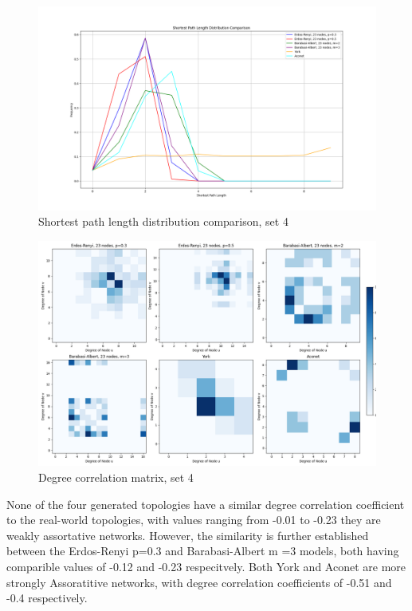 \begin{figure}
    \centering
    \includegraphics[width=0.9\linewidth]{images/FINAL-TOPO-COMP/line-23.png}
    \caption{Shortest path length distribution comparison, set 4}
    \label{fig:enter-label}
\end{figure}

\begin{figure}
    \centering
    \includegraphics[width=0.9\linewidth]{images/FINAL-TOPO-COMP/Degree-correlation-matrices/23-matrix.png}
    \caption{Degree correlation matrix, set 4}
    \label{fig:enter-label}
\end{figure}
None of the four generated topologies have a similar degree correlation coefficient to the real-world topologies, with values ranging from -0.01 to -0.23 they are weakly assortative networks. However, the similarity is further established between the Erdos-Renyi p=0.3 and Barabasi-Albert m =3 models, both having comparible values of -0.12 and -0.23 respecitvely. Both York and Aconet are more strongly Assoratitive networks, with degree correlation coefficients of -0.51 and -0.4 respectively. 

